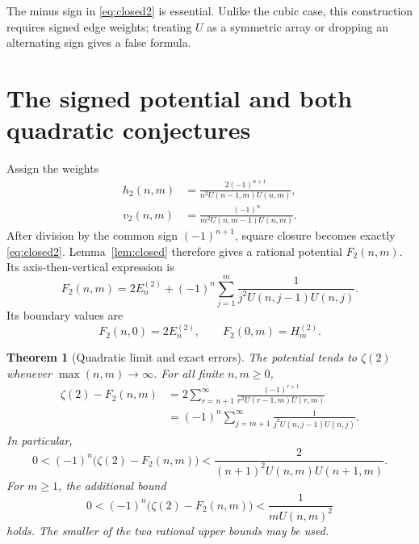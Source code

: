 \documentclass[11pt]{article}
\numberwithin{equation}{section}
\newtheorem{theorem}{Theorem}[section]
\theoremstyle{definition}
\theoremstyle{remark}
\newcommand{\HS}[2]{H_{#1}^{(#2)}}
\newcommand{\ES}[1]{E_{#1}^{(2)}}
\begin{document}
The minus sign in \eqref{eq:closed2} is essential. Unlike the cubic case,
this construction requires signed edge weights; treating $U$ as a
symmetric array or dropping an alternating sign gives a false formula.

\section{The signed potential and both quadratic conjectures}\label{sec:proof2}

Assign the weights
\begin{align}
 h_2(n,m)&=\frac{2(-1)^{n+1}}{n^2U(n-1,m)U(n,m)},\label{eq:h2}\\
 v_2(n,m)&=\frac{(-1)^n}{m^2U(n,m-1)U(n,m)}.\label{eq:v2}
\end{align}
After division by the common sign $(-1)^{n+1}$, square closure becomes
exactly \eqref{eq:closed2}. Lemma~\ref{lem:closed} therefore gives a
rational potential $F_2(n,m)$. Its axis-then-vertical expression is
\begin{equation}\label{eq:F2}
 F_2(n,m)=2\ES{n}
 +(-1)^n\sum_{j=1}^m\frac1{j^2U(n,j-1)U(n,j)}.
\end{equation}
Its boundary values are
\begin{equation}\label{eq:F2axes}
 F_2(n,0)=2\ES{n},\qquad F_2(0,m)=\HS{m}{2}.
\end{equation}

\begin{theorem}[Quadratic limit and exact errors]\label{thm:error2}
The potential tends to $\zeta(2)$ whenever $\max(n,m)\to\infty$.
For all finite $n,m\geq0$,
\begin{align}
 \zeta(2)-F_2(n,m)
 &=2\sum_{r=n+1}^{\infty}
 \frac{(-1)^{r+1}}{r^2U(r-1,m)U(r,m)}\label{eq:tail2h}\\
 &=(-1)^n\sum_{j=m+1}^{\infty}
 \frac1{j^2U(n,j-1)U(n,j)}.\label{eq:tail2v}
\end{align}
In particular,
\begin{equation}\label{eq:bound2h}
 0<(-1)^n\bigl(\zeta(2)-F_2(n,m)\bigr)
 <\frac2{(n+1)^2U(n,m)U(n+1,m)}.
\end{equation}
For $m\geq1$, the additional bound
\begin{equation}\label{eq:bound2v}
 0<(-1)^n\bigl(\zeta(2)-F_2(n,m)\bigr)
 <\frac1{mU(n,m)^2}
\end{equation}
holds. The smaller of the two rational upper bounds may be used.
\end{theorem}
\end{document}
